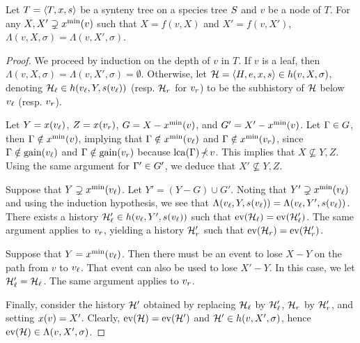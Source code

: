 \begin{lemma}\label{lem:synesth:2choices-contents}
    Let \(T = \left\langle T, x, s\right\rangle\) be a synteny tree on a species tree \(S\) and \(v\) be a node of \(T\).
    For any \(X, X' \supsetneq x^{\mathrm{min}}(v)\) such that \(X = f(v, X)\) and \(X' = f(v, X')\),
    \(\Lambda(v, X, \sigma) = \Lambda(v, X', \sigma)\).
\end{lemma}
\begin{proof}
    We proceed by induction on the depth of \(v\) in \(T\).
    If \(v\) is a leaf, then \(\Lambda(v, X, \sigma) = \Lambda(v, X', \sigma) = \emptyset\).
    Otherwise, let \(\mathcal{H} = \left\langle H, e, x, s\right\rangle \in h(v, X, \sigma)\), denoting \(\mathcal{H}_\mathit{\ell} \in h(v_\mathit{\ell}, Y, s(v_\mathit{\ell}))\) (resp. \(\mathcal{H}_r\) for \(v_r\)) to be the subhistory of \(\mathcal{H}\) below \(v_\mathit{\ell}\) (resp. \(v_r\)).

    Let \(Y = x(v_\mathit{\ell})\), \(Z = x(v_r)\),
        \(G = X - x^{\mathrm{min}}(v)\), and \(G' = X' - x^{\mathrm{min}}(v)\).
    Let \(\Gamma \in G\),
        then \(\Gamma \notin x^{\mathrm{min}}(v)\),
        implying that \(\Gamma \notin x^{\mathrm{min}}(v_\mathit{\ell})\) and
            \(\Gamma \notin x^{\mathrm{min}}(v_r)\),
        since \(\Gamma \notin \mathrm{gain}(v_\mathit{\ell})\) and
            \(\Gamma \notin \mathrm{gain}(v_r)\)
        because \(\lca(\geneFamily) \nottdescneq v\).
    This implies that \(X \not\subseteq Y, Z\).
    Using the same argument for \(\Gamma' \in G'\), we deduce that \(X' \not\subseteq Y, Z\).

    Suppose that \(Y \supsetneq x^{\mathrm{min}}(v_\mathit{\ell})\).
    Let \(Y' = (Y - G) \cup G'\).
    Noting that \(Y' \supsetneq x^{\mathrm{min}}(v_\mathit{\ell})\) and using the induction hypothesis, we see that \(\Lambda(v_\mathit{\ell}, Y, s(v_\mathit{\ell})) = \Lambda(v_\mathit{\ell}, Y', s(v_\mathit{\ell}))\).
    There exists a history \(\mathcal{H}'_\mathit{\ell} \in h(v_\mathit{\ell}, Y', s(v_\mathit{\ell}))\) such that \(\mathrm{ev}(\mathcal{H}_\mathit{\ell}) = \mathrm{ev}(\mathcal{H}_\mathit{\ell}')\).
    The same argument applies to \(v_r\), yielding a history \(\mathcal{H}'_r\) such that \(\mathrm{ev}(\mathcal{H}_r) = \mathrm{ev}(\mathcal{H}_r')\).

    Suppose that \(Y = x^{\mathrm{min}}(v_\mathit{\ell})\).
    Then there must be an event to lose \(X - Y\) on the path from \(v\) to \(v_\mathit{\ell}\).
    That event can also be used to lose \(X' - Y\).
    In this case, we let \(\mathcal{H}_\mathit{\ell}' = \mathcal{H}_\mathit{\ell}\).
    The same argument applies to \(v_r\).

    Finally, consider the history \(\mathcal{H}'\) obtained by replacing \(\mathcal{H}_\mathit{\ell}\) by \(\mathcal{H}'_\mathit{\ell}\), \(\mathcal{H}_r\) by \(\mathcal{H}'_r\), and setting \(x(v) = X'\).
    Clearly, \(\mathrm{ev}(\mathcal{H}) = \mathrm{ev}(\mathcal{H}')\) and \(\mathcal{H}' \in h(v, X', \sigma)\), hence \(\mathrm{ev}(\mathcal{H}) \in \Lambda(v, X', \sigma)\).
\end{proof}

